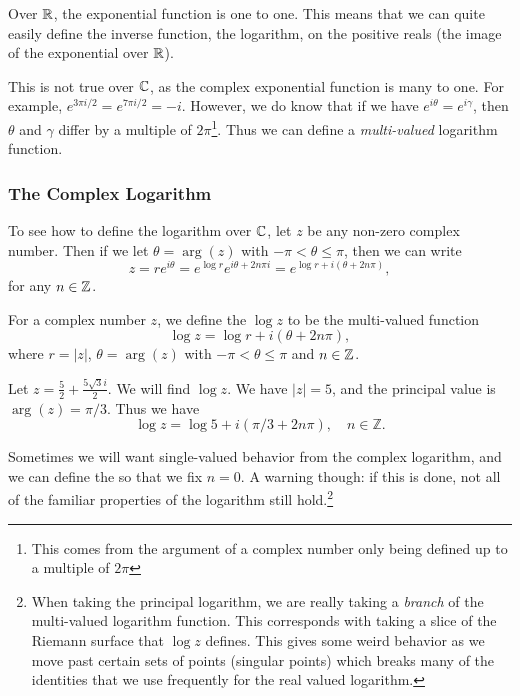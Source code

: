 \documentclass[a4paper]{scrartcl}
\begin{document}
Over $\mathbb{R}$, the exponential function is one to one. This means that we can quite easily define the inverse function, the logarithm, on the positive reals (the image of the exponential over $\mathbb{R}$).

This is not true over $\mathbb{C}$, as the complex exponential function is many to one. For example, $e^{3\pi i/2} = e^{7 \pi i/2} = -i$. However, we do know that if we have $e^{i\theta} = e^{i \gamma}$, then $\theta$ and $\gamma$ differ by a multiple of $2 \pi$\footnote{This comes from the argument of a complex number only being defined up to a multiple of $2\pi$}. Thus we can define a \emph{multi-valued} logarithm function.

\subsubsection{The Complex Logarithm}

To see how to define the logarithm over $\mathbb{C}$, let $z$ be any non-zero complex number. Then if we let $\theta = \arg(z)$ with $-\pi < \theta \leq \pi$, then we can write
$$
z = re^{i \theta} =  e^{\log r} e^{i \theta + 2n \pi i} = e^{\log r + i(\theta + 2n \pi)},
$$
for any $n \in \mathbb{Z}$.

\begin{definition}
	For a complex number $z$, we define the  $\log z$ to be the multi-valued function
	$$
	\log z = \log r + i(\theta + 2n\pi),
	$$
	where $r = |z|$, $\theta = \arg (z)$ with $- \pi < \theta \leq \pi$ and $n \in \mathbb{Z}$.
\end{definition}

\begin{example}
	Let $z = \frac{5}{2} + \frac{5\sqrt{3} i}{2}$. We will find $\log z$. We have $|z| = 5$, and the principal value is $\arg(z) = \pi/3$. Thus we have
	$$
	\log z = \log 5 + i (\pi/3 + 2n \pi), \quad n \in \mathbb{Z}.
	$$
\end{example}

Sometimes we will want single-valued behavior from the complex logarithm, and we can define the  so that we fix $n = 0$. A warning though: if this is done, not all of the familiar properties of the logarithm still hold.\footnote{When taking the principal logarithm, we are really taking a \emph{branch} of the multi-valued logarithm function. This corresponds with taking a slice of the Riemann surface that $\log z$ defines. This gives some weird behavior as we move past certain sets of points (singular points) which breaks many of the identities that we use frequently for the real valued logarithm.}
\end{document}
